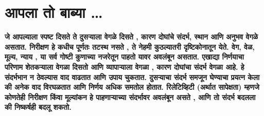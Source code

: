 \chapter{आपला तो बाब्या …}

\textcolor{blue!60!black}{\textbf{जे आपल्याला स्पष्ट दिसते ते दुसऱ्याला वेगळे दिसते , कारण दोघांचे संदर्भ, स्थान आणि अनुभव वेगळे असतात. निरीक्षण हे कधीच पूर्णतः तटस्थ नसते , ते नेहमी कुठल्यातरी दृष्टिकोनातून येते. वेग, वेळ, मूल्य, न्याय , या सर्व गोष्टी कुणाच्या नजरेतून पाहतो यावर अवलंबून असतात. एखाद्या निर्णयाचा परिणाम शेतकऱ्याला वेगळा दिसतो आणि व्यापाऱ्याला वेगळा , कारण दोघांचा संदर्भ वेगळा आहे. हे संदर्भभान न ठेवल्यास वाद वाढतात आणि उपाय चुकतात. दुसऱ्याचा संदर्भ समजून घेण्याचा प्रयत्न केला की अनेक वाद विरघळतात आणि निर्णय अधिक समतोल होतात. रिलेटिव्हिटी (अर्थात सापेक्षता) म्हणजे कोणतेही निरीक्षण किंवा मूल्यांकन हे पाहणाऱ्याच्या संदर्भावर अवलंबून असते , आणि तो संदर्भ बदलला की निष्कर्षही बदलू शकतो.}}

